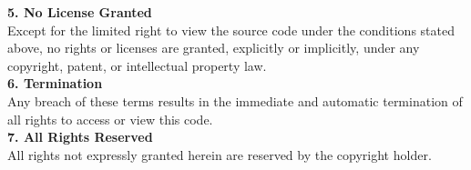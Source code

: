 \noindent
\textbf{5. No License Granted}\\
Except for the limited right to view the source code under the conditions stated above, no rights or licenses are granted, explicitly or implicitly, under any copyright, patent, or intellectual property law.\\

\noindent
\textbf{6. Termination}\\
Any breach of these terms results in the immediate and automatic termination of all rights to access or view this code.\\

\noindent
\textbf{7. All Rights Reserved}\\
All rights not expressly granted herein are reserved by the copyright holder.\\

